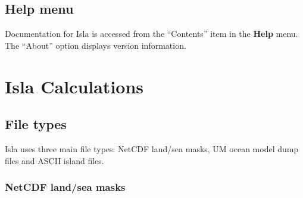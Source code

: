 \documentclass[11pt,makeidx,texhelp]{report}
\begin{document}


\section{Help menu}

Documentation for Isla is accessed from the ``Contents'' item in the
\textbf{Help} menu.  The ``About'' option displays version
information.




\chapter{Isla Calculations}

\section{File types}

Isla uses three main file types: NetCDF land/sea masks, UM ocean model
dump files and ASCII island files.

\subsection{NetCDF land/sea masks}
\end{document}
